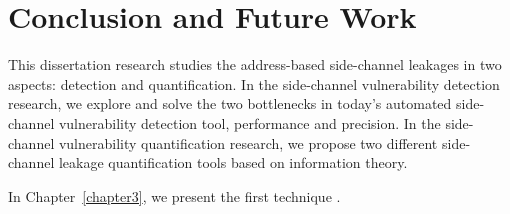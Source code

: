 \chapter{Conclusion and Future Work}\label{chapter6}
This dissertation research studies the address-based side-channel leakages in two aspects: detection and quantification. In the side-channel vulnerability detection research, we explore and solve the two bottlenecks in today's automated side-channel vulnerability detection tool, performance and precision. In the side-channel vulnerability quantification research, we propose two different side-channel leakage quantification tools based on information theory. 

In Chapter~\ref{chapter3}, we present the first technique \detect{}.